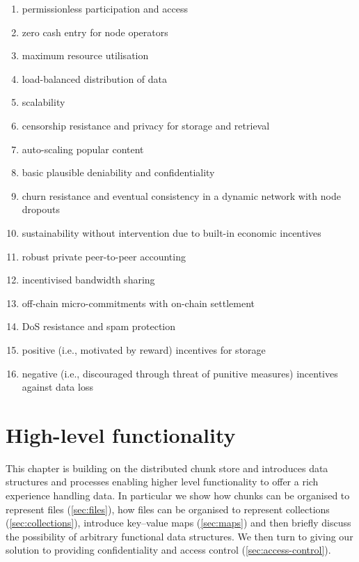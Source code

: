 \begin{enumerate}
    \item permissionless participation and access
    \item zero cash entry for node operators
    \item maximum resource utilisation 
    \item load-balanced distribution of data
    \item scalability 
    \item censorship resistance and privacy for storage and retrieval
    \item auto-scaling popular content
    \item basic plausible deniability and confidentiality 
    \item churn resistance and eventual consistency in a dynamic network with node dropouts
    \item sustainability without intervention due to built-in economic incentives
    \item robust private peer-to-peer accounting 
    \item incentivised bandwidth sharing
    \item off-chain micro-commitments with on-chain settlement
    \item DoS resistance and spam protection
    \item positive (i.e., motivated by reward) incentives for storage
    \item negative (i.e., discouraged through threat of punitive measures) incentives against data loss
\end{enumerate}


\chapter{High-level functionality}\label{sec:high-level-functionality}


This chapter is building on the distributed chunk store and introduces data structures and processes enabling higher level functionality to offer a rich experience handling data. In particular we show how chunks can be organised to represent files (\ref{sec:files}), how files can be organised to represent collections (\ref{sec:collections}), introduce key--value maps (\ref{sec:maps}) and then briefly discuss the possibility of arbitrary functional data structures. We then turn to giving our solution to providing confidentiality and access control (\ref{sec:access-control}). 

